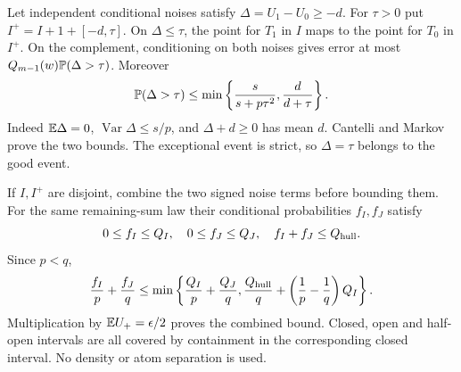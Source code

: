 Let independent conditional noises satisfy $\Delta=U_1-U_0\ge-d$.
For $\tau>0$ put $I^+=I+1+[-d,\tau]$. On $\Delta\le\tau$, the
point for $T_1$ in $I$ maps to the point for $T_0$ in $I^+$. On the
complement, conditioning on both noises gives error at most
$Q_{m-1}(w)\mathbb P(\Delta>\tau)$. Moreover
\begin{equation}\label{conf:bad}
 \mathbb P(\Delta>\tau)\le
 \min\left\{\frac{s}{s+p\tau^2},\frac d{d+\tau}\right\}.
\end{equation}
Indeed $\mathbb E\Delta=0$, $\operatorname{Var}\Delta\le s/p$, and
$\Delta+d\ge0$ has mean $d$. Cantelli and Markov prove the two bounds.
The exceptional event is strict, so $\Delta=\tau$ belongs to the good event.

If $I,I^+$ are disjoint, combine the two signed noise terms before
bounding them. For the same remaining-sum law their conditional
probabilities $f_I,f_J$ satisfy
\[
 0\le f_I\le Q_I,\quad0\le f_J\le Q_J,\quad f_I+f_J\le Q_{\rm hull}.
\]
Since $p<q$,
\[
 \frac{f_I}{p}+\frac{f_J}{q}
 \le\min\left\{\frac{Q_I}p+\frac{Q_J}q,
 \frac{Q_{\rm hull}}q+\left(\frac1p-\frac1q\right)Q_I\right\}.
\]
Multiplication by $\mathbb E U_+=\epsilon/2$ proves the combined bound.
Closed, open and half-open intervals are all covered by containment in
the corresponding closed interval. No density or atom separation is used.

